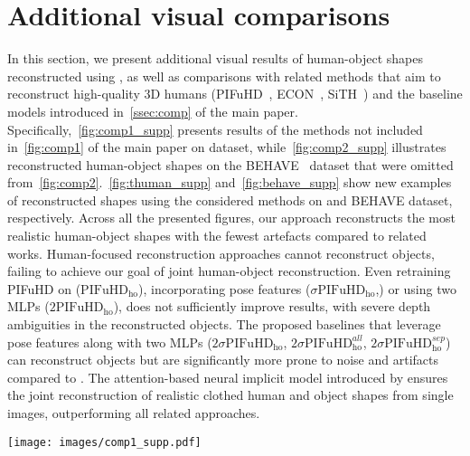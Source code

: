 \section{Additional visual comparisons}
\label{sec:comp_supp}
In this section, we present additional visual results of human-object  shapes reconstructed using \name, as well as comparisons with related methods that aim to reconstruct high-quality 3D humans (PIFuHD~\cite{pifuhd}, ECON~\cite{econ}, SiTH~\cite{ho2024sith}) and the baseline models introduced in~\cref{ssec:comp} of the main paper. 
Specifically,~\cref{fig:comp1_supp} presents results of the methods not included in~\cref{fig:comp1} of the main paper on \dataname dataset, while~\cref{fig:comp2_supp} illustrates reconstructed human-object shapes on the BEHAVE~\cite{bhatnagar2022behave} dataset that were omitted from~\cref{fig:comp2}.~\cref{fig:thuman_supp} and~\cref{fig:behave_supp} show new examples of reconstructed shapes using the considered methods on \dataname and BEHAVE dataset, respectively. 
Across all the presented figures, our approach reconstructs the most realistic human-object shapes with the fewest artefacts compared to related works. Human-focused reconstruction approaches cannot reconstruct objects, failing to achieve our goal of joint human-object reconstruction.
Even retraining PIFuHD on \dataname ($\mathrm{PIFuHD}_{\mathrm{ho}}$), incorporating  pose features ($\sigma\mathrm{PIFuHD}_{\mathrm{ho}}$,) or using two MLPs ($2\mathrm{PIFuHD}_{\mathrm{ho}}$), does not sufficiently improve results, with severe depth ambiguities in the reconstructed objects. 
The proposed baselines that leverage pose features along with two MLPs ($2\sigma\mathrm{PIFuHD}_{\mathrm{ho}}$, $2\sigma\mathrm{PIFuHD}^{all}_{\mathrm{ho}}$, $2\sigma\mathrm{PIFuHD}^{sep}_{\mathrm{ho}}$) can reconstruct objects but are significantly more prone to noise and artifacts compared to \name. The attention-based neural implicit model introduced by \name ensures the joint reconstruction of realistic clothed human and object shapes from single images, outperforming all related approaches.
\begin{figure*}[b!]
  \centering
\texttt{[image: images/comp1\_supp.pdf]}
\vspace{-4mm}
\caption{Visual comparisons from \dataname with related works not shown in~\cref{fig:comp1} of the main paper. Front and side views are shown.}
\label{fig:comp1_supp}
\end{figure*}

